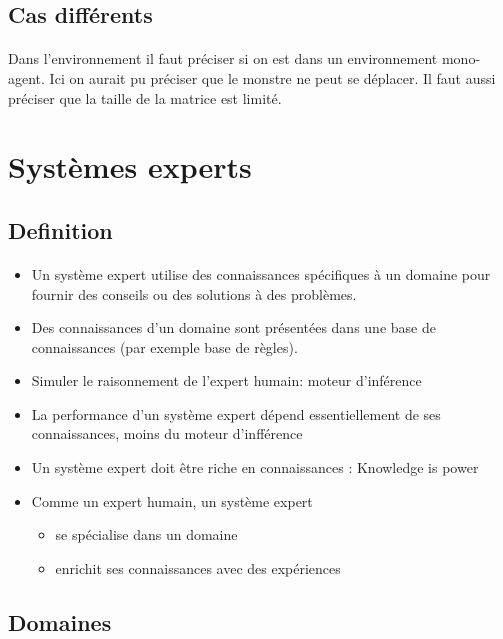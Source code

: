 \documentclass{article}
\begin{document}
\subsection{Cas différents}
\paragraph{}
Dans l'environnement il faut préciser si on est dans un environnement mono-agent.
Ici on aurait pu préciser que le monstre ne peut se déplacer.
Il faut aussi préciser que la taille de la matrice est limité.

\newpage

\section{Systèmes experts}

\subsection{Definition}

\paragraph{}

\begin{itemize}
	\item Un système expert utilise des connaissances spécifiques à un domaine pour fournir des conseils ou des solutions à des problèmes.
  	\item Des connaissances d'un domaine sont présentées dans une base de connaissances (par exemple base de règles).
	\item Simuler le raisonnement de l'expert humain: moteur d'inférence
	\item La performance d'un système expert dépend essentiellement de ses connaissances, moins du moteur d'infférence
	\item Un système expert doit être riche en connaissances : Knowledge is power
	\item Comme un expert humain, un système expert
	\begin{itemize}
		\item se spécialise dans un domaine
		\item enrichit ses connaissances avec des expériences
	\end{itemize}
\end{itemize}

\subsection{Domaines}
\end{document}
